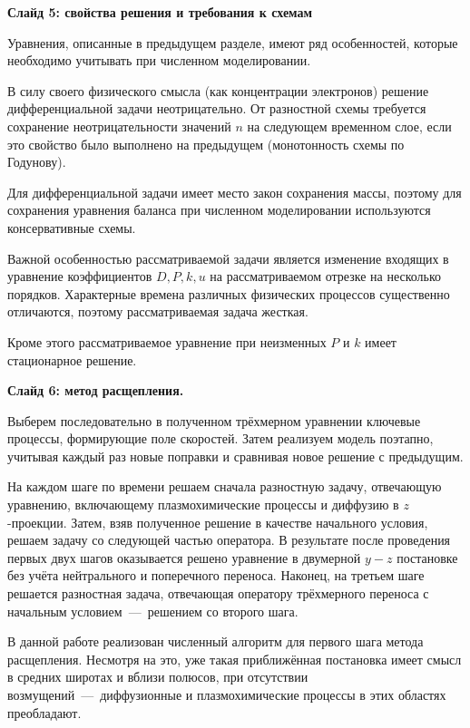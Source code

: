 \documentclass[2pt, a4paper, fleqn]{extarticle}
\begin{document}

\medskip

{\bf Слайд 5: свойства решения и требования к схемам}

Уравнения, описанные в предыдущем разделе, имеют ряд особенностей, которые необходимо учитывать при численном моделировании.

В силу своего физического смысла (как концентрации электронов) решение дифференциальной задачи неотрицательно. От разностной схемы требуется сохранение неотрицательности значений $n$ на следующем временном слое, если это свойство было выполнено на предыдущем (монотонность схемы по Годунову). 


Для дифференциальной задачи имеет место закон сохранения массы, поэтому для сохранения уравнения баланса при численном моделировании используются консервативные схемы.

Важной особенностью рассматриваемой задачи является изменение входящих в уравнение коэффициентов $D, P, k, u$ на рассматриваемом отрезке на несколько порядков. 
Характерные времена различных физических процессов существенно отличаются, поэтому рассматриваемая задача жесткая.

Кроме этого рассматриваемое уравнение при неизменных $P$ и $k$ имеет стационарное решение.

\medskip

{\bf Слайд 6: метод расщепления.}


Выберем последовательно в полученном трёхмерном уравнении ключевые процессы, формирующие поле скоростей. Затем реализуем модель поэтапно, учитывая каждый раз новые поправки и сравнивая новое решение с предыдущим.

На каждом шаге по времени решаем сначала разностную задачу, отвечающую уравнению, включающему плазмохимические процессы и диффузию в $z$-проекции. Затем, взяв полученное решение в качестве начального условия, решаем задачу со следующей частью оператора. В результате после проведения первых двух шагов оказывается решено уравнение в двумерной $y-z$ постановке без учёта нейтрального и поперечного переноса. Наконец, на третьем шаге решается разностная задача, отвечающая оператору трёхмерного переноса с начальным условием~---~решением со второго шага. 

В данной работе реализован численный алгоритм для первого шага метода расщепления. Несмотря на это, уже такая приближённая постановка имеет смысл в средних широтах и вблизи полюсов, при отсутствии возмущений~---~диффузионные и плазмохимические процессы в этих областях преобладают.
\end{document}

